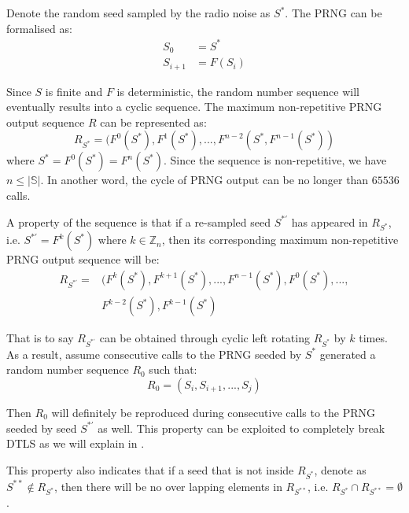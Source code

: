 Denote the random seed sampled by the radio noise as $S^*$. The PRNG can be formalised as:
\begin{equation}
	\begin{aligned}
	S_{0} &= S^* \\
	S_{i+1} &= F(S_{i})
	\end{aligned}
\end{equation}

Since ${S}$ is finite and $F$ is deterministic, the random number sequence will eventually results into a cyclic sequence. The maximum non-repetitive PRNG output sequence $R$ can be represented as:
\begin{equation}
R_{S^*}= (F^0(S^{*}), F^{1}(S^{*}), ..., F^{n-2}(S^{*}, F^{n-1}(S^{*}))
\end{equation}
where $S^{*} = F^{0}(S^{*}) = F^{n}(S^{*})$. Since the sequence is non-repetitive, we have $n \leq |\mathbb{S}|$. In another word, the cycle of PRNG output can be no longer than $65536$ calls.

A property of the sequence is that if a re-sampled seed $S^{*'}$ has appeared in $R_{S^*}$, i.e. $S^{*'} = F^{k}(S^*)$ where $k \in \mathbb{Z}_n$, then its corresponding maximum non-repetitive PRNG output sequence will be:
\begin{equation}
	\begin{aligned}
	R_{S^{*'}} = &( F^{k}(S^*), F^{k+1}(S^{*}), ..., F^{n-1}(S^*), F^{0}(S^*), ...,\\
	&F^{k-2}(S^{*}), F^{k-1}(S^{*})
	\end{aligned}
\end{equation}

That is to say $R_{S^{*'}}$ can be obtained through cyclic left rotating $R_{S^*}$ by $k$ times. As a result, assume consecutive calls to the PRNG seeded by $S^*$ generated a random number sequence $R_0$ such that:
\begin{equation}
R_0 = (S_i, S_{i+1}, ..., S_{j})
\end{equation}

Then $R_0$ will definitely be reproduced during consecutive calls to the PRNG seeded by seed $S^{*'}$ as well. This property can be exploited to completely break DTLS as we will explain in .

This property also indicates that if a seed that is not inside $R_{S^*}$, denote as $S^{**} \notin R_{S^*}$, then there will be no over lapping elements in $R_{S^{**}}$, i.e. $R_{S^{*}} \cap R_{S^{**}} = \emptyset$.

